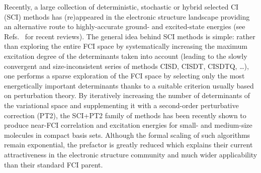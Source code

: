 \documentclass[aip,jcp,reprint,noshowkeys,superscriptaddress]{revtex4-1}
\begin{document}
Recently, a large collection of deterministic, stochastic or hybrid selected CI (SCI) methods \cite{Bender_1969,Whitten_1969,Huron_1973} has (re)appeared \cite{Booth_2009,Deustua_2017,Holmes_2016,Eriksen_2017,Xu_2018,Giner_2013,Giner_2015,Evangelista_2014,Tubman_2016,Liu_2016,Ohtsuka_2017,Zimmerman_2017,Coe_2018,Garniron_2018,Eriksen_2019} in the electronic structure landscape providing an alternative route to highly-accurate ground- and excited-state energies \cite{Holmes_2017,Li_2018,Li_2020,Loos_2018a,Chien_2018,Loos_2019,Loos_2020b,Loos_2020c,Loos_2020e,qp2,Eriksen_2020,Yao_2020,Veril_2021} (see Refs.~ for recent reviews).
The general idea behind SCI methods is simple: rather than exploring the entire FCI space by systematically increasing the maximum excitation degree of the determinants taken into account (leading to the slowly convergent and size-inconsistent series of methods CISD, CISDT, CISDTQ, \ldots), one performs a sparse exploration of the FCI space by selecting only the most energetically important determinants thanks to a suitable criterion usually based on perturbation theory. \cite{Huron_1973,Garniron_2017,Sharma_2017,qp2}
By iteratively increasing the number of determinants of the variational space and supplementing it with a second-order perturbative correction (PT2), the SCI+PT2 family of methods has been recently shown to produce near-FCI correlation and excitation energies for small- and medium-size molecules in compact basis sets.\cite{Holmes_2017,Loos_2018a,Chien_2018,Loos_2019,Loos_2020b,Loos_2020c,qp2,Veril_2021}
Although the formal scaling of such algorithms remain exponential, the prefactor is greatly reduced which explains their current attractiveness in the electronic structure community and much wider applicability than their standard FCI parent. 
\end{document}

